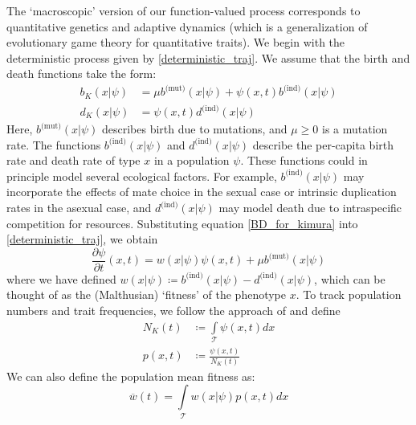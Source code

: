 The `macroscopic' version of our function-valued process corresponds to quantitative genetics and adaptive dynamics (which is a generalization of evolutionary game theory for quantitative traits). We begin with the deterministic process given by \eqref{deterministic_traj}. We assume that the birth and death functions take the form:
\begin{equation}
\label{BD_for_kimura}
\begin{aligned}
b_K(x|\psi) &= \mu b^{\textrm{(mut)}}(x|\psi) + \psi(x,t)b^{\textrm{(ind)}}(x|\psi)\\
d_K(x|\psi) &= \psi(x,t)d^{\textrm{(ind)}}(x|\psi)
\end{aligned}
\end{equation}
Here, $ b^{\textrm{(mut)}}(x|\psi)$ describes birth due to mutations, and $\mu \geq 0$ is a mutation rate. The functions $b^{\textrm{(ind)}}(x|\psi)$ and $d^{\textrm{(ind)}}(x|\psi)$ describe the per-capita birth rate and death rate of type $x$ in a population $\psi$. These functions could in principle model several ecological factors. For example,  $b^{\textrm{(ind)}}(x|\psi)$ may incorporate the effects of mate choice in the sexual case or intrinsic duplication rates in the asexual case, and $d^{\textrm{(ind)}}(x|\psi)$ may model death due to intraspecific competition for resources. Substituting equation \eqref{BD_for_kimura} into \eqref{deterministic_traj}, we obtain
\begin{equation}
\label{PDE_for_kimura}
\frac{\partial \psi}{\partial t}(x,t) = w(x|\psi)\psi(x,t) + \mu b^{\textrm{(mut)}}(x|\psi)
\end{equation}
where we have defined $w(x|\psi) \coloneqq b^{\textrm{(ind)}}(x|\psi) - d^{\textrm{(ind)}}(x|\psi)$, which can be thought of as the (Malthusian) `fitness' of the phenotype $x$. To track population numbers and trait frequencies, we follow the approach of \citep{week_white_2021} and define
\begin{equation}
\label{pop_size_and_freq_for_kimura}
\begin{aligned}
N_K(t) &\coloneqq \int\limits_{\mathcal{T}}\psi(x,t)dx\\
p(x,t) &\coloneqq \frac{\psi(x,t)}{N_K(t)}
\end{aligned}
\end{equation}
We can also define the population mean fitness as:
\begin{equation}
\label{mean_fitness_for_kimura}
\overline{w}(t) = \int\limits_{\mathcal{T}}w(x|\psi)p(x,t)dx
\end{equation}
